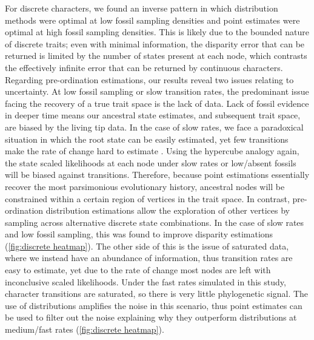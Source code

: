 \documentclass[11pt, a4paper]{article}
\begin{document}
For discrete characters, we found an inverse pattern in which distribution methods were optimal at low fossil sampling densities and point estimates were optimal at high fossil sampling densities.
This is likely due to the bounded nature of discrete traits; even with minimal information, the disparity error that can be returned is limited by the number of states present at each node, which contrasts the effectively infinite error that can be returned by continuous characters.
Regarding pre-ordination estimations, our results reveal two issues relating to uncertainty.
At low fossil sampling or slow transition rates, the predominant issue facing the recovery of a true trait space is the lack of data.
Lack of fossil evidence in deeper time means our ancestral state estimates, and subsequent trait space, are biased by the living tip data.
In the case of slow rates, we face a paradoxical situation in which the root state can be easily estimated, yet few transitions make the rate of change hard to estimate \citep{gascuel2020darwinian}.
Using the hypercube analogy again, the state scaled likelihoods at each node under slow rates or low/absent fossils will be biased against transitions.
Therefore, because point estimations essentially recover the most parsimonious evolutionary history, ancestral nodes will be constrained within a certain region of vertices in the trait space.
In contrast, pre-ordination distribution estimations allow the exploration of other vertices by sampling across alternative discrete state combinations.
In the case of slow rates and low fossil sampling, this was found to improve disparity estimations (\autoref{fig:discrete heatmap}).
The other side of this is the issue of saturated data, where we instead have an abundance of information, thus transition rates are easy to estimate, yet due to the rate of change most nodes are left with inconclusive scaled likelihoods.
Under the fast rates simulated in this study, character transitions are saturated, so there is very little phylogenetic signal.
The use of distributions amplifies the noise in this scenario, thus point estimates can be used to filter out the noise explaining why they outperform distributions at medium/fast rates (\autoref{fig:discrete heatmap}). 
\end{document}
